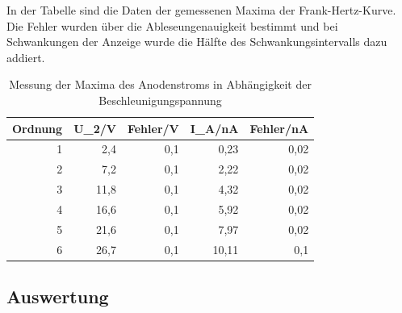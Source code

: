 \documentclass[12pt,a4paper]{article}
\begin{document}
In der Tabelle sind die Daten der gemessenen Maxima der Frank-Hertz-Kurve. Die Fehler wurden über die Ableseungenauigkeit bestimmt und bei Schwankungen der Anzeige wurde die Hälfte des Schwankungsintervalls dazu addiert.

\begin{table}[htbp]
\caption{Messung der Maxima des  Anodenstroms in Abhängigkeit der Beschleunigungspannung}
\begin{center}
\begin{tabular}{|r|r|r|r|r|}
\hline
\multicolumn{1}{|l|}{Ordnung} & \multicolumn{1}{l|}{U\_2/V} & \multicolumn{1}{l|}{Fehler/V} & \multicolumn{1}{l|}{I\_A/nA} & \multicolumn{1}{l|}{Fehler/nA} \\ \hline
1 & 2,4 & 0,1 & 0,23 & 0,02 \\ \hline
2 & 7,2 & 0,1 & 2,22 & 0,02 \\ \hline
3 & 11,8 & 0,1 & 4,32 & 0,02 \\ \hline
4 & 16,6 & 0,1 & 5,92 & 0,02 \\ \hline
5 & 21,6 & 0,1 & 7,97 & 0,02 \\ \hline
6 & 26,7 & 0,1 & 10,11 & 0,1 \\ \hline
\end{tabular}
\end{center}
\label{tab:q__max_messung}
\end{table}



\subsection{Auswertung}
\end{document}
